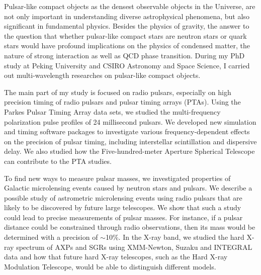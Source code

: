 \begin{eabstract}

Pulsar-like compact objects as the densest observable objects in the Universe, 
are not only important in understanding diverse astrophysical phenomena, but 
also significant in fundamental physics. Besides the physics of gravity, the 
answer to the question that whether pulsar-like compact stars are neutron stars 
or quark stars would have profound implications on the physics of condensed 
matter, the nature of strong interaction as well as QCD phase transition. During 
my PhD study at Peking University and CSIRO Astronomy and Space Science, I 
carried out multi-wavelength researches on pulsar-like compact objects. 

The main part of my study is focused on radio pulsars, especially on high precision 
timing of radio pulsars and pulsar timing arrays (PTAs). Using the Parkes Pulsar 
Timing Array data sets, we studied the multi-frequency polarization pulse profiles 
of 24 millisecond pulsars. We developed new simulation and timing software packages 
to investigate various frequency-dependent effects on the precision of pulsar timing, 
including interstellar scintillation and dispersive delay. We also studied how the 
Five-hundred-meter Aperture Spherical Telescope can contribute to the PTA studies. 

To find new ways to measure pulsar masses, we investigated properties of Galactic 
microlensing events caused by neutron stars and pulsars. We describe a possible 
study of astrometric microlensing events using radio pulsars that are likely to 
be discovered by future large telescopes. We show that such a study could lead 
to precise measurements of pulsar masses. For instance, if a pulsar distance could 
be constrained through radio observations, then its mass would be determined with 
a precision of $\sim$10\%. In the X-ray band, we studied the hard X-ray spectrum 
of AXPs and SGRs using XMM-Newton, Suzaku and INTEGRAL data and how that future 
hard X-ray telescopes, such as the Hard X-ray Modulation Telescope, would be 
able to distinguish different models. 

\end{eabstract}

